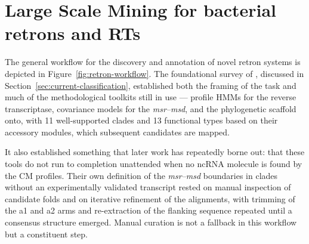

\section{Large Scale Mining for bacterial retrons and RTs} 


The general workflow for the discovery and annotation of novel retron systems is
depicted in Figure~\ref{fig:retron-workflow}. The foundational survey of
\cite{mestre2020}, discussed in Section~\ref{sec:current-classification}, established both the
framing of the task and much of the methodological toolkits still in use ---
profile HMMs for the reverse transcriptase, covariance models for the
\textit{msr--msd}, and the phylogenetic scaffold onto, with 11 well-supported clades and 13 functional types based on their accessory modules, which subsequent candidates
are mapped.


It also established something that later work has repeatedly borne
out: that these tools do not run to completion unattended when no ncRNA molecule is found by the CM profiles. Their own definition
of the \textit{msr--msd} boundaries in clades without an experimentally validated
transcript rested on manual inspection of candidate folds and on iterative
refinement of the alignments, with trimming of the a1 and a2 arms and re-extraction
of the flanking sequence repeated until a consensus structure emerged. Manual
curation is not a fallback in this workflow but a constituent step.



